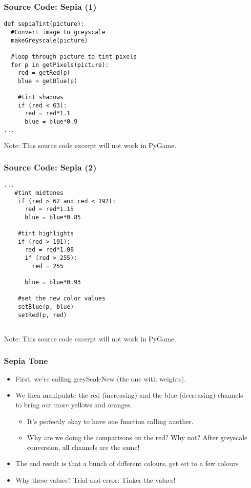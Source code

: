 

\begin{frame}[fragile]
	\frametitle{Source Code: Sepia (1)}
	
\begin{lstlisting}
def sepiaTint(picture):
  #Convert image to greyscale
  makeGreyscale(picture)

  #loop through picture to tint pixels
  for p in getPixels(picture):
    red = getRed(p)
    blue = getBlue(p)

    #tint shadows
    if (red < 63):
      red = red*1.1
      blue = blue*0.9
...
\end{lstlisting}

Note: This source code excerpt will not work in PyGame.

\end{frame}

\begin{frame}[fragile]
	\frametitle{Source Code: Sepia (2)}
	
\begin{lstlisting}
...
   #tint midtones
    if (red > 62 and red < 192):
      red = red*1.15
      blue = blue*0.85

    #tint highlights
    if (red > 191):
      red = red*1.08
      if (red > 255):
        red = 255

      blue = blue*0.93

    #set the new color values
    setBlue(p, blue)
    setRed(p, red)


\end{lstlisting}

Note: This source code excerpt will not work in PyGame.

\end{frame}

\begin{frame}
	\frametitle{Sepia Tone}
	
	\begin{itemize}		
		\item First, we're calling greyScaleNew (the one with weights).
		\item We then manipulate the red (increasing) and the blue (decreasing) channels to bring out more yellows and oranges.
		\begin{itemize}
			\item It's perfectly okay to have one function calling another.
			\item Why are we doing the comparisons on the red? Why not?  After greyscale conversion, all channels are the same!
		\end{itemize}	
		\item The end result is that a bunch of different colours, get set to a few colours
		\item Why these values? Trial-and-error: Tinker the values!

	\end{itemize}
\end{frame}

